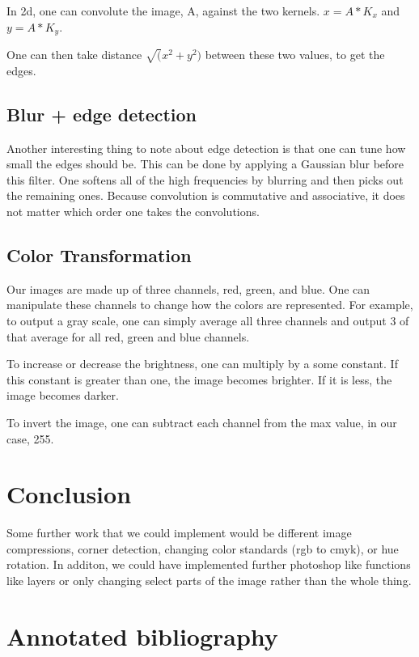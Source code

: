 \documentclass[11pt]{article}
\begin{document}
In 2d, one can convolute the image, A, against the two kernels. $x = A*K_x$ and $y=A*K_y$. 

One can then take distance $\sqrt(x^2+y^2)$ between these two values, to get the edges. 


\subsection{Blur + edge detection}
Another interesting thing to note about edge detection is that one can tune how small the edges should be. This can be done by applying a Gaussian blur before this filter. One softens all of the high frequencies by blurring and then picks out the remaining ones. 
Because convolution is commutative and associative, it does not matter which order one takes the convolutions.

\subsection{Color Transformation}
Our images are made up of three channels, red, green, and blue. One can manipulate these channels to change how the colors are represented. For example, to output a gray scale, one can simply average all three channels and output 3 of that average for all red, green and blue channels.

To increase or decrease the brightness, one can multiply by a some constant. If this constant is greater than one, the image becomes brighter. If it is less, the image becomes darker. 

To invert the image, one can subtract each channel from the max value, in our case, 255.





\section{Conclusion}
Some further work that we could implement would be different image compressions, corner detection, changing color standards (rgb to cmyk), or hue rotation. In additon, we could have implemented further photoshop like
functions like layers or only changing select parts of the image rather than the whole thing.

\section{Annotated bibliography}
\end{document}
